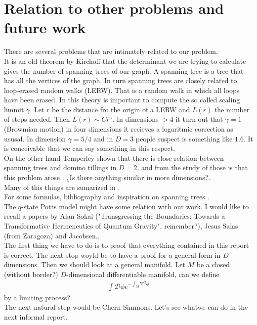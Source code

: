 \documentclass[12pt]{article}
\def\DD{\mathcal{D}}
\begin{document}
\section{Relation to other problems and future work}
There are several problems that are intimately related to our problem.\\
It is an old theorem by Kirchoff that the determinant we are trying to calculate gives the number of spanning trees of our graph. A spanning tree is a tree that has all the vertices of the graph. In turn spanning trees are closely related to loop-erased random walks (LERW). That is a random walk in which all loops have been erased. In this theory is important to compute the so called scaling limmit $\gamma$. Let $r$ be the distance fro the origin of a LERW and $L(r)$ the number of steps needed. Then $L(r)\sim Cr^\gamma$. In dimensions $>4$ it turn out that $\gamma=1$ (Browmian motion) in four dimensions it recieves a logaritmic correction as ususal. In dimension $\gamma=5/4$ and in $D=3$ people suspect is something like $1.6$. It is conceivable that we can say something in this respect.\\
On the other hand Temperley shown that there is close relation between spanning trees and domino tillings in $D=2$, and from the study of those is that this problem arose \cite{Kas}. ¿Is there anything similar in more dimensions?.\\
Many of this things are sumarized in \cite{DupDav}.\\
For some formulas, bibliography and inspiration on spanning trees \cite{Lyo}.\\
The $q$-state Potts model might have some relation with our work. I would like to recall a papers by Alan Sokal ("Transgressing the Boundaries: Towards a Transformative Hermeneutics of Quantum Gravity", remember?), Jesus Salas (from Zaragoza) and Jacobsen.\cite{JacSalSok}.\\
The first thing we have to do is to proof that everything contained in this report is correct. The next stop woyld be to have a proof for a general form in $D$-dimensions. Then we should look at a general manifold. Let $M$ be a closed (without border?) $D$-dimensional differentiable manifold, can we define
\begin{gather}
\int\DD \phi e^{-\int_M \nabla^2\phi}
\end{gather}
by a limiting process?.\\
The next natural step would be Chern-Simmons. Let's see whatwe can do in the next informal report.
\end{document}
